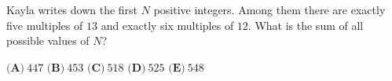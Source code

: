 Kayla writes down the first $N$ positive integers. Among them there are exactly five multiples of $13$ and exactly six multiples of $12$. What is the sum of all possible values of $N$?

$\textbf{(A)}\ $$447$ \qquad $\textbf{(B)}\ $$453$ \qquad $\textbf{(C)}\ $$518$ \qquad $\textbf{(D)}\ $$525$ \qquad $\textbf{(E)}\ $$548$
